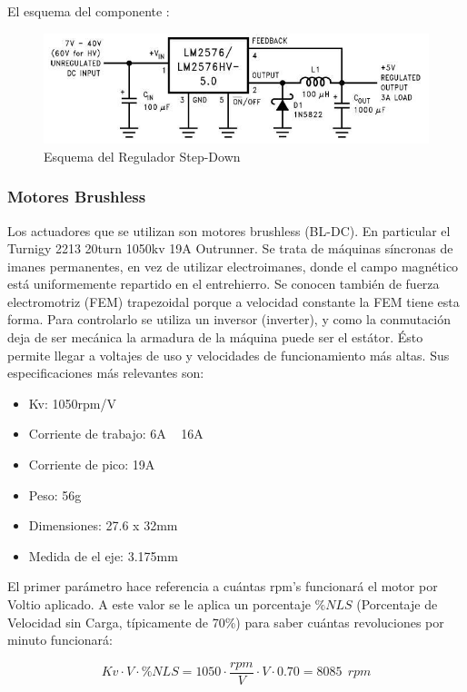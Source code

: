 \documentclass[twoside,11pt]{book}
\begin{document}
El esquema del componente \cite{lm2576s}:

\begin{figure}[h!]
\begin{center}
\includegraphics[scale=0.55,bb=0 0 570 192]{images/lm2576s.png} 
\caption{Esquema del Regulador Step-Down}
\end{center}
\end{figure}


\subsubsection*{Motores Brushless}
Los actuadores que se utilizan son motores brushless (BL-DC). En particular el Turnigy 2213 20turn 1050kv 19A Outrunner.
Se trata de máquinas síncronas de imanes permanentes, en vez de utilizar electroimanes, donde el campo magnético está uniformemente repartido  en el entrehierro. Se conocen también de fuerza electromotriz (FEM) trapezoidal porque a velocidad constante la FEM tiene esta forma. 
Para controlarlo se utiliza un inversor (inverter), y como la conmutación deja de ser mecánica la armadura de la máquina puede ser el estátor. Ésto permite llegar a voltajes de uso y velocidades de funcionamiento más altas.
Sus especificaciones más relevantes son:
\begin{itemize}
\item Kv: 1050rpm/V
\item Corriente de trabajo: 6A ~ 16A
\item Corriente de pico: 19A
\item Peso: 56g
\item Dimensiones: 27.6 x 32mm
\item Medida de el eje: 3.175mm
\end{itemize}

El primer parámetro hace referencia a cuántas rpm's funcionará el motor por Voltio aplicado. A este valor se le aplica un porcentaje $\%NLS$ (Porcentaje de Velocidad sin Carga, típicamente de 70\%) para saber cuántas revoluciones por minuto funcionará:

\begin{equation}
Kv  \cdot V \cdot \%NLS = 1050 \cdot \frac{rpm}{V}\cdot V \cdot 0.70 = 8085 \>\> rpm
\end{equation}
\end{document}
